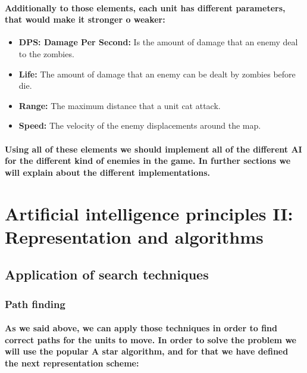 \documentclass[a4paper,10pt]{article}
\newcommand{\p}[1]{\paragraph{\indent\textnormal{#1}}}
\begin{document}
    \p{Additionally to those elements, each unit has different parameters, that would make it stronger o weaker:}

      \begin{itemize}
       \item \textbf{DPS: Damage Per Second:} Is the amount of damage that an enemy deal to the zombies.
       \item \textbf{Life:} The amount of damage that an enemy can be dealt by zombies before die.
       \item \textbf{Range:} The maximum distance that a unit cat attack.
       \item \textbf{Speed:} The velocity of the enemy displacements around the map.
      \end{itemize}

    \p{Using all of these elements we should implement all of the different AI for the different kind of enemies in the game. In further sections we will explain about the different implementations.}



  \newpage
\section{Artificial intelligence principles II: Representation and algorithms}

  \subsection{Application of search techniques}

    \subsubsection{Path finding}
    \p{As we said above, we can apply those techniques in order to find correct paths for the units to move. In order to solve the problem we will use the popular A star algorithm, and for that we have defined the next representation scheme:}
\end{document}
